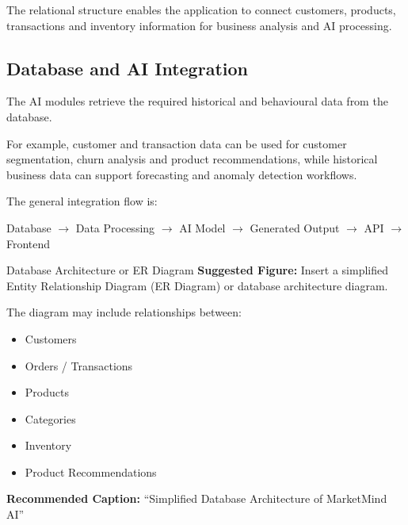 \documentclass[12pt,a4paper]{report}
\begin{document}
The relational structure enables the application to connect customers,
products, transactions and inventory information for business analysis
and AI processing.

\subsection{Database and AI Integration}

The AI modules retrieve the required historical and behavioural data
from the database.

For example, customer and transaction data can be used for customer
segmentation, churn analysis and product recommendations, while
historical business data can support forecasting and anomaly detection
workflows.

The general integration flow is:

\begin{center}
Database $\rightarrow$ Data Processing $\rightarrow$ AI Model
$\rightarrow$ Generated Output $\rightarrow$ API $\rightarrow$ Frontend
\end{center}

\begin{screenshotplaceholder}{Database Architecture or ER Diagram}
\textbf{Suggested Figure:} Insert a simplified Entity Relationship Diagram
(ER Diagram) or database architecture diagram.

\vspace{0.2cm}

The diagram may include relationships between:

\begin{itemize}
    \item Customers
    \item Orders / Transactions
    \item Products
    \item Categories
    \item Inventory
    \item Product Recommendations
\end{itemize}

\vspace{0.2cm}

\textbf{Recommended Caption:}
``Simplified Database Architecture of MarketMind AI''
\end{screenshotplaceholder}


\end{document}
